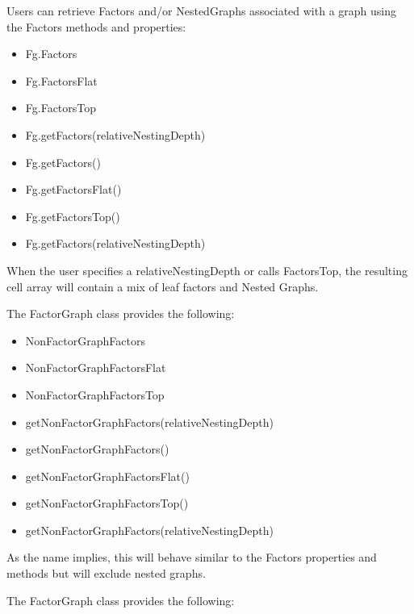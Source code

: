 Users can retrieve Factors and/or NestedGraphs associated with a graph using the Factors methods and properties:

\ifmatlab
\begin{itemize}
\item Fg.Factors
\item Fg.FactorsFlat
\item Fg.FactorsTop
\item Fg.getFactors(relativeNestingDepth)
\end{itemize}
\fi

\ifjava
\begin{itemize}
\item Fg.getFactors()
\item Fg.getFactorsFlat()
\item Fg.getFactorsTop()
\item Fg.getFactors(relativeNestingDepth)
\end{itemize}
\fi

When the user specifies a relativeNestingDepth or calls FactorsTop, the resulting \ifmatlab cell \fi array will contain a mix of leaf factors and Nested Graphs.


The FactorGraph class provides the following:

\ifmatlab
\begin{itemize}
\item NonFactorGraphFactors
\item NonFactorGraphFactorsFlat
\item NonFactorGraphFactorsTop
\item getNonFactorGraphFactors(relativeNestingDepth)
\end{itemize}
\fi

\ifjava
\begin{itemize}
\item getNonFactorGraphFactors()
\item getNonFactorGraphFactorsFlat()
\item getNonFactorGraphFactorsTop()
\item getNonFactorGraphFactors(relativeNestingDepth)
\end{itemize}
\fi


As the name implies, this will behave similar to the Factors properties and methods but will exclude nested graphs.


The FactorGraph class provides the following:

